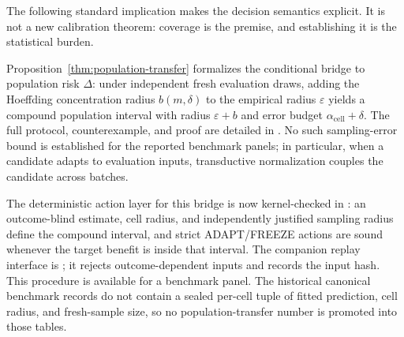The following standard implication makes the decision semantics explicit. It is not a new
calibration theorem: coverage is the premise, and establishing it is the statistical burden.



Proposition~\ref{thm:population-transfer} formalizes the conditional bridge to population risk $\Delta$: under independent fresh evaluation draws, adding the Hoeffding concentration radius $b(m,\delta)$ to the empirical radius $\varepsilon$ yields a compound population interval with radius $\varepsilon+b$ and error budget $\alpha_{\mathrm{cell}}+\delta$. The full protocol, counterexample, and proof are detailed in . No such sampling-error bound is established for the reported benchmark panels; in particular, when a candidate adapts to evaluation inputs, transductive normalization couples the candidate across batches.

The deterministic action layer for this bridge is now kernel-checked in
: an outcome-blind estimate,
cell radius, and independently justified sampling radius define the compound interval,
and strict ADAPT/FREEZE actions are sound whenever the target benefit is inside that
interval. The companion replay interface is
; it rejects outcome-dependent
inputs and records the input hash. This procedure is available for a benchmark panel.
The historical canonical benchmark records do not contain a sealed per-cell tuple of
fitted prediction, cell radius, and fresh-sample size, so no population-transfer number
is promoted into those tables.

